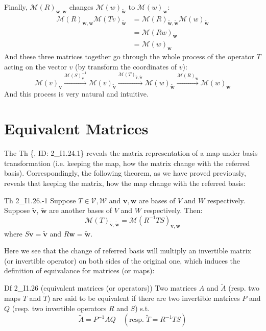 \documentclass{article}
\newcommand{\basisTilde}[1]{\tilde{\pmb{#1}}}
\begin{document}
Finally, $\mathcal{M}(R)_{\pmb{w}, \pmb{w}}$ changes $\mathcal{M}(w)_{\basisTilde{w}}$ to $\mathcal{M}(w)_{\pmb{w}}$:
$$
\begin{aligned}
    \mathcal{M}(R)_{\pmb{w}, \pmb{w}}\mathcal{M}(Tv)_{\basisTilde{w}} &= \mathcal{M}(R)_{\basisTilde{w}, \basisTilde{w}}\mathcal{M}(w)_{\basisTilde{w}} \\
    &= \mathcal{M}(Rw)_{\basisTilde{w}} \\
    &= \mathcal{M}(w)_{\pmb{w}}
\end{aligned}
$$
And these three matrices together go through the whole process of the operator $T$ acting on the vector $v$ (by transform the coordinates of $v$):
$$\mathcal{M}(v)_{\pmb{v}}\overset{\mathcal{M}(S)^{-1}_{\pmb{v}}}{\longrightarrow}\mathcal{M}(v)_{\basisTilde{v}}\overset{\mathcal{M}(T)_{\basisTilde{v}, \basisTilde{w}}}{\longrightarrow}\mathcal{M}(w)_{\basisTilde{w}}\overset{\mathcal{M}(R)_{\pmb{w}}}{\longrightarrow}\mathcal{M}(w)_{\pmb{w}}$$
And this process is very natural and intuitive.

\section{Equivalent Matrices}
The Th \{, ID: 2\_I1.24.1\} reveals the matrix representation of a map under basis transformation (i.e. keeping the map, how the matrix change with the referred basis). Correspondingly, the following theorem, as we have proved previously, reveals that keeping the matrix, how the map change with the referred basis:
\begin{Th}{Th 2\_I1.26.-1}
    Suppose $T\in\mathcal{V, W}$ and $\pmb{v}, \pmb{w}$ are bases of $V$ and $W$ respectively. Suppose $\basisTilde{v}$, $\basisTilde{w}$ are another bases of $V$ and $W$ respectively. Then:
    $$\mathcal{M}(T)_{\basisTilde{v}, \basisTilde{w}} = \mathcal{M}(R^{-1}TS)_{\pmb{v}, \pmb{w}}$$
    where $S\pmb{v} = \basisTilde{v}$ and $R\pmb{w} = \basisTilde{w}$.
\end{Th}

Here we see that the change of referred basis will multiply an invertible matrix (or invertible operator) on both sides of the original one, which induces the definition of equivalance for matrices (or maps):
\begin{Df}{Df 2\_I1.26 (equivalent matrices (or operators))}
    Two matrices $A$ and $\tilde{A}$ (resp. two maps $T$ and $\tilde{T}$) are said to be equivalent if there are two invertible matrices $P$ and $Q$ (resp. two invertible operators $R$ and $S$) s.t.
    $$ \tilde{A} = P^{-1}AQ \quad(\text{resp. } \tilde{T} = R^{-1}TS) $$
\end{Df}
\end{document}
